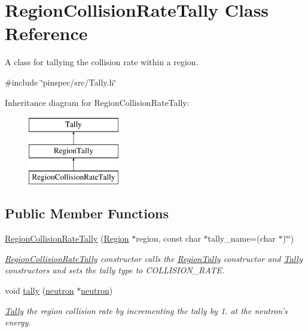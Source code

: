 \hypertarget{classRegionCollisionRateTally}{\section{Region\-Collision\-Rate\-Tally Class Reference}
\label{classRegionCollisionRateTally}
}


A class for tallying the collision rate within a region.  




{\ttfamily \#include \char`\"{}pinspec/src/\-Tally.\-h\char`\"{}}

Inheritance diagram for Region\-Collision\-Rate\-Tally\-:\begin{figure}[H]
\begin{center}
\leavevmode
\includegraphics[height=3.000000cm]{classRegionCollisionRateTally}
\end{center}
\end{figure}
\subsection*{Public Member Functions}
\begin{DoxyCompactItemize}
\item 
\hyperlink{classRegionCollisionRateTally_a4665e117d3c7be7ce66ae9a23e031e73}{Region\-Collision\-Rate\-Tally} (\hyperlink{classRegion}{Region} $\ast$region, const char $\ast$tally\-\_\-name=(char $\ast$)\char`\"{}\char`\"{})
\begin{DoxyCompactList}\small\item\em \hyperlink{classRegionCollisionRateTally}{Region\-Collision\-Rate\-Tally} constructor calls the \hyperlink{classRegionTally}{Region\-Tally} constructor and \hyperlink{classTally}{Tally} constructors and sets the tally type to C\-O\-L\-L\-I\-S\-I\-O\-N\-\_\-\-R\-A\-T\-E. \end{DoxyCompactList}\item 
void \hyperlink{classRegionCollisionRateTally_af365f111715d80311047029fe2e64ce7}{tally} (\hyperlink{structneutron}{neutron} $\ast$\hyperlink{structneutron}{neutron})
\begin{DoxyCompactList}\small\item\em \hyperlink{classTally}{Tally} the region collision rate by incrementing the tally by 1. at the neutron's energy. \end{DoxyCompactList}\end{DoxyCompactItemize}
